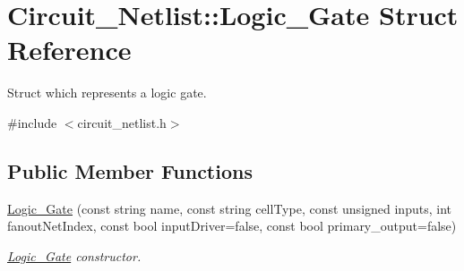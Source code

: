 \hypertarget{structCircuit__Netlist_1_1Logic__Gate}{\section{Circuit\-\_\-\-Netlist\-:\-:Logic\-\_\-\-Gate Struct Reference}
\label{structCircuit__Netlist_1_1Logic__Gate}
}


Struct which represents a logic gate.  




{\ttfamily \#include $<$circuit\-\_\-netlist.\-h$>$}

\subsection*{Public Member Functions}
\begin{DoxyCompactItemize}
\item 
\hyperlink{structCircuit__Netlist_1_1Logic__Gate_a81569a5c27c575b1725c5da2c2090f54}{Logic\-\_\-\-Gate} (const string name, const string cell\-Type, const unsigned inputs, int fanout\-Net\-Index, const bool input\-Driver=false, const bool primary\-\_\-output=false)
\begin{DoxyCompactList}\small\item\em \hyperlink{structCircuit__Netlist_1_1Logic__Gate}{Logic\-\_\-\-Gate} constructor. \end{DoxyCompactList}\end{DoxyCompactItemize}
